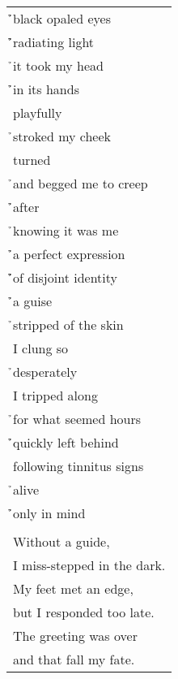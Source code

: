\documentclass{article}
\begin{document}
\begin{center}
\begin{tabular}{l}
\h\h{}black opaled eyes \\
\h\h\h{}radiating light \\
\h{}it took my head \\
\h\h{}in its hands \\
playfully \\
\h{}stroked my cheek \\
turned \\
\h{}and begged me to creep \\
\h\h{}after \\
\h{}knowing it was me \\
\h\h{}a perfect expression \\
\h\h\h{}of disjoint identity \\
\h\h{}a guise \\
\h{}stripped of the skin \\
I clung so \\
\h{}desperately \\
I tripped along \\
\h{}for what seemed hours \\
\h\h{}quickly left behind \\
following tinnitus signs \\
\h{}alive \\
\h\h{}only in mind \\
\\
Without a guide, \\
I miss-stepped in the dark. \\
My feet met an edge, \\
but I responded too late. \\
The greeting was over \\
and that fall my fate. \\
\end{tabular}
\end{center}
\end{document}
